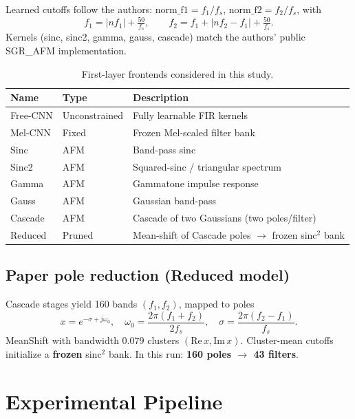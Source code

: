 \documentclass[11pt,a4paper]{article}
\begin{document}
Learned cutoffs follow the authors: $\mathrm{norm\_f1}=f_1/f_s$, $\mathrm{norm\_f2}=f_2/f_s$, with
\[
f_1=\lvert nf_1\rvert+\tfrac{50}{f_s},\qquad
f_2=f_1+\lvert nf_2-f_1\rvert+\tfrac{50}{f_s}.
\]
Kernels (sinc, sinc2, gamma, gauss, cascade) match the authors' public SGR\_AFM implementation.

\begin{table}[H]
\centering
\caption{First-layer frontends considered in this study.}
\label{tab:frontends}
\begin{tabular}{@{}llp{7.2cm}@{}}
\toprule
\textbf{Name} & \textbf{Type} & \textbf{Description} \\
\midrule
Free-CNN & Unconstrained & Fully learnable FIR kernels \\
Mel-CNN  & Fixed         & Frozen Mel-scaled filter bank \\
Sinc     & AFM           & Band-pass sinc \\
Sinc2    & AFM           & Squared-sinc / triangular spectrum \\
Gamma    & AFM           & Gammatone impulse response \\
Gauss    & AFM           & Gaussian band-pass \\
Cascade  & AFM           & Cascade of two Gaussians (two poles/filter) \\
Reduced  & Pruned        & Mean-shift of Cascade poles $\to$ frozen sinc$^2$ bank \\
\bottomrule
\end{tabular}
\end{table}

\subsection{Paper pole reduction (Reduced model)}

Cascade stages yield 160 bands $(f_1,f_2)$, mapped to poles
\begin{equation}
  x = e^{-\sigma + j\omega_0},\quad
  \omega_0=\frac{2\pi(f_1+f_2)}{2f_s},\quad
  \sigma=\frac{2\pi(f_2-f_1)}{f_s}.
\end{equation}
MeanShift with bandwidth $0.079$ clusters $(\mathrm{Re}\,x,\mathrm{Im}\,x)$. Cluster-mean cutoffs initialize a \textbf{frozen} sinc$^2$ bank. In this run: \textbf{160 poles $\to$ 43 filters}.

\section{Experimental Pipeline}
\end{document}
